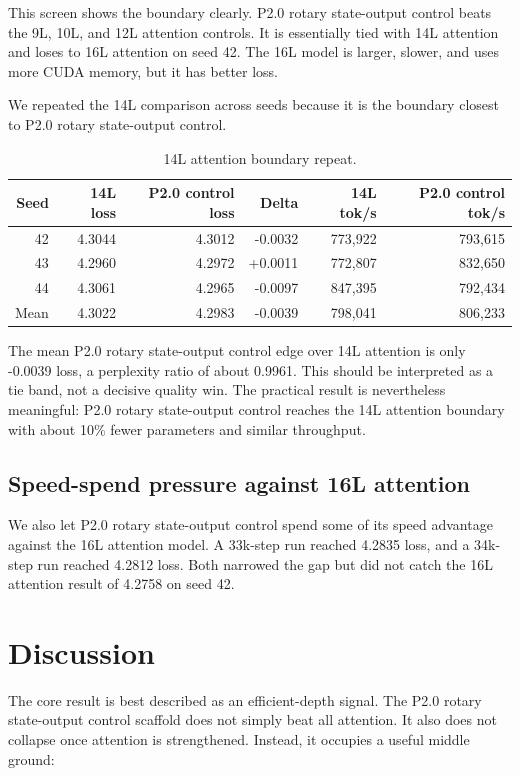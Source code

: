 \documentclass[11pt]{article}
\newcommand{\pcontrol}{P2.0 rotary state-output control}
\newcommand{\pctrlshort}{P2.0 control}
\begin{document}
This screen shows the boundary clearly. \pcontrol{} beats the 9L, 10L, and
12L attention controls. It is essentially tied with 14L attention and loses to
16L attention on seed 42. The 16L model is larger, slower, and uses more CUDA
memory, but it has better loss.

We repeated the 14L comparison across seeds because it is the boundary closest
to \pcontrol{}.

\begin{table}[h]
\centering
\caption{14L attention boundary repeat.}
\label{tab:14l}
\begin{tabular}{rrrrrr}
\toprule
Seed & 14L loss & \pctrlshort{} loss & Delta & 14L tok/s & \pctrlshort{} tok/s \\
\midrule
42 & 4.3044 & 4.3012 & -0.0032 & 773,922 & 793,615 \\
43 & 4.2960 & 4.2972 & +0.0011 & 772,807 & 832,650 \\
44 & 4.3061 & 4.2965 & -0.0097 & 847,395 & 792,434 \\
\midrule
Mean & 4.3022 & 4.2983 & -0.0039 & 798,041 & 806,233 \\
\bottomrule
\end{tabular}
\end{table}

The mean \pcontrol{} edge over 14L attention is only -0.0039 loss, a
perplexity ratio of about 0.9961. This should be interpreted as a tie band, not
a decisive quality win. The practical result is nevertheless meaningful:
\pcontrol{} reaches the 14L attention boundary with about 10\% fewer
parameters and similar throughput.

\subsection{Speed-spend pressure against 16L attention}

We also let \pcontrol{} spend some of its speed advantage against the 16L
attention model. A 33k-step run reached 4.2835 loss, and a 34k-step run reached
4.2812 loss. Both narrowed the gap but did not catch the 16L attention result
of 4.2758 on seed 42.

\section{Discussion}

The core result is best described as an efficient-depth signal. The
\pcontrol{} scaffold does not simply beat all attention. It also does not
collapse once attention is strengthened. Instead, it occupies a useful middle
ground:
\end{document}
